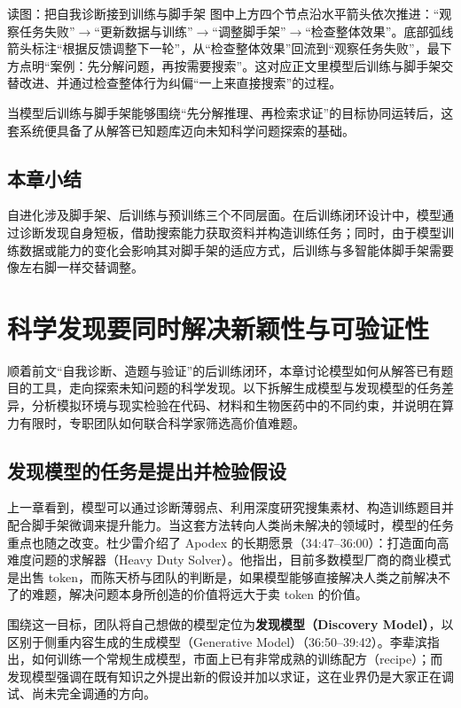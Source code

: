 \documentclass[UTF8,a4paper,11pt,fontset=fandol]{ctexart}
\begin{document}
\begin{knowledgebox}{读图：把自我诊断接到训练与脚手架}
图中上方四个节点沿水平箭头依次推进：“观察任务失败”\ensuremath{\rightarrow}“更新数据与训练”\ensuremath{\rightarrow}“调整脚手架”\ensuremath{\rightarrow}“检查整体效果”。底部弧线箭头标注“根据反馈调整下一轮”，从“检查整体效果”回流到“观察任务失败”，最下方点明“案例：先分解问题，再按需要搜索”。这对应正文里模型后训练与脚手架交替改进、并通过检查整体行为纠偏“一上来直接搜索”的过程。
\end{knowledgebox}
当模型后训练与脚手架能够围绕“先分解推理、再检索求证”的目标协同运转后，这套系统便具备了从解答已知题库迈向未知科学问题探索的基础。
\subsection{本章小结}
自进化涉及脚手架、后训练与预训练三个不同层面。在后训练闭环设计中，模型通过诊断发现自身短板，借助搜索能力获取资料并构造训练任务；同时，由于模型训练数据或能力的变化会影响其对脚手架的适应方式，后训练与多智能体脚手架需要像左右脚一样交替调整。
\section{科学发现要同时解决新颖性与可验证性}
顺着前文“自我诊断、造题与验证”的后训练闭环，本章讨论模型如何从解答已有题目的工具，走向探索未知问题的科学发现。以下拆解生成模型与发现模型的任务差异，分析模拟环境与现实检验在代码、材料和生物医药中的不同约束，并说明在算力有限时，专职团队如何联合科学家筛选高价值难题。
\subsection{发现模型的任务是提出并检验假设}
上一章看到，模型可以通过诊断薄弱点、利用深度研究搜集素材、构造训练题目并配合脚手架微调来提升能力。当这套方法转向人类尚未解决的领域时，模型的任务重点也随之改变。杜少雷介绍了 Apodex 的长期愿景（34:47–36:00）：打造面向高难度问题的求解器（Heavy Duty Solver）。他指出，目前多数模型厂商的商业模式是出售 token，而陈天桥与团队的判断是，如果模型能够直接解决人类之前解决不了的难题，解决问题本身所创造的价值将远大于卖 token 的价值。

围绕这一目标，团队将自己想做的模型定位为\textbf{发现模型（Discovery Model）}，以区别于侧重内容生成的生成模型（Generative Model）（36:50–39:42）。李辈滨指出，如何训练一个常规生成模型，市面上已有非常成熟的训练配方（recipe）；而发现模型强调在既有知识之外提出新的假设并加以求证，这在业界仍是大家正在调试、尚未完全调通的方向。
\end{document}

